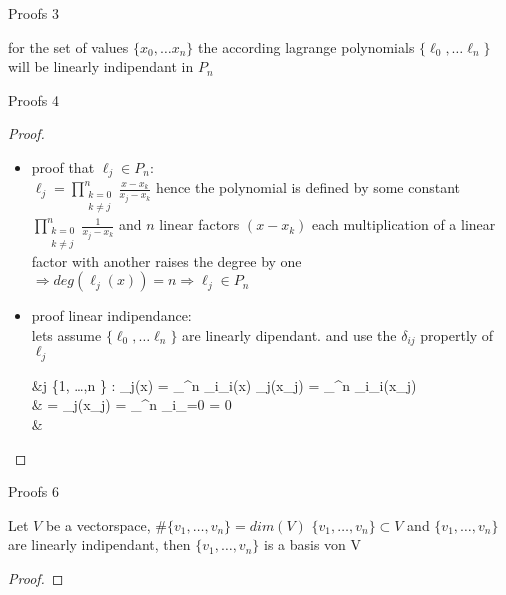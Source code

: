 \documentclass[8pt]{beamer}
\begin{document}
\begin{frame}{Proofs 3}
	\begin{theorem}
		for the set of values $\{x_0, \ldots x_n \}$ the according lagrange polynomials $\{\ell_0, \ldots \ell_n \}$ will be linearly indipendant in $P_n$
	\end{theorem}
\end{frame}

\begin{frame}{Proofs 4}
	 \begin{proof}
		\begin{itemize}
			\item 
				proof that $\ell_j \in P_n$:\\
				$\displaystyle \ell_j = \prod_{\substack{k= 0 \\ k \neq j }}^{n}\frac{x - x_k}{x_j - x_k}$ hence the polynomial is defined by some constant $\displaystyle \prod_{\substack{k= 0 \\ k \neq j }}^{n}\frac{1}{x_j - x_k}$ and $ n$ linear factors $(x-x_k)$ each multiplication of a linear factor with another raises the degree by one $\Rightarrow deg(\ell_j(x)) = n \Rightarrow \ell_j \in P_n$
			 \item proof linear indipendance:\\
			 lets assume $\{\ell_0, \ldots \ell_n \}$ are linearly dipendant. and use the $\delta_{ij}$ propertly of $\ell_j$
			 \begin{flalign*}
			 	&\exists j \in \{1, \ldots ,n \} : \ell_j(x) = \sum_{}^{n} \alpha_i\ell_i(x)
			 	\Rightarrow  \ell_j(x_j) = \sum_{}^{n} \alpha_i\ell_i(x_j)\\
			 	 & = \ell_j(x_j) = \sum_{}^{n} \alpha_i_{=0} = 0 \lightning\\& \Rightarrow {}
			 \end{flalign*}
		\end{itemize}
	 \end{proof}
\end{frame}

\begin{frame}{Proofs 6}
	\begin{theorem}
		Let $V$ be a vectorspace, $\#\{v_1, \ldots, v_n\} = dim(V)$  $\{v_1, \ldots, v_n\}\subset V$ and $\{v_1, \ldots, v_n\}$ are linearly indipendant, then $\{v_1, \ldots, v_n\}$ is a basis von V 
	\end{theorem}
	\begin{proof}
		
	\end{proof}
	
\end{frame}
\end{document}
